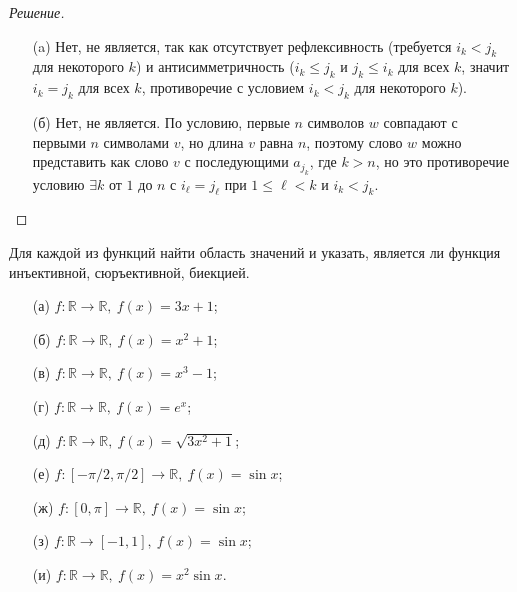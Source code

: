 \documentclass{article}
\begin{document}
\begin{proof}[Решение]\
\begin{enumerate}
    \item[(a)] Нет, не является, так как отсутствует рефлексивность (требуется $i_k < j_k$ для некоторого $k$) и антисимметричность ($i_k \le j_k$ и $j_k \le i_k$ для всех $k$, значит $i_k = j_k$ для всех $k$, противоречие с условием $i_k < j_k$ для некоторого $k$).
    
    
    \item[(б)] Нет, не является. По условию, первые $n$ символов $w$ совпадают с первыми $n$ символами $v$, но длина $v$ равна $n$, поэтому слово $w$ можно представить как слово $v$ с последующими $a_{j_k}$, где $k > n$, но это противоречие условию $\exists k$ от $1$ до $n$ с $i_\ell=j_\ell$ при $1\le \ell<k$ и $i_k<j_k$.
\end{enumerate}
\end{proof}

\begin{task}[2]
Для каждой из функций найти область значений и указать, является ли функция инъективной, сюръективной, биекцией.
\begin{enumerate}
    \item[(а)] $f : \mathbb{R} \to \mathbb{R},\ f(x) = 3x + 1$;
    \item[(б)] $f : \mathbb{R} \to \mathbb{R},\ f(x) = x^2 + 1$;
    \item[(в)] $f : \mathbb{R} \to \mathbb{R},\ f(x) = x^3 - 1$;
    \item[(г)] $f : \mathbb{R} \to \mathbb{R},\ f(x) = e^x$;
    \item[(д)] $f : \mathbb{R} \to \mathbb{R},\ f(x) = \sqrt{3x^2 + 1}$;
    \item[(е)] $f : [-\pi/2, \pi/2] \to \mathbb{R},\ f(x) = \sin x$;
    \item[(ж)] $f : [0, \pi] \to \mathbb{R},\ f(x) = \sin x$;
    \item[(з)] $f : \mathbb{R} \to [-1, 1],\ f(x) = \sin x$;
    \item[(и)] $f : \mathbb{R} \to \mathbb{R},\ f(x) = x^2 \sin x$.
\end{enumerate}
\end{task}
\end{document}
